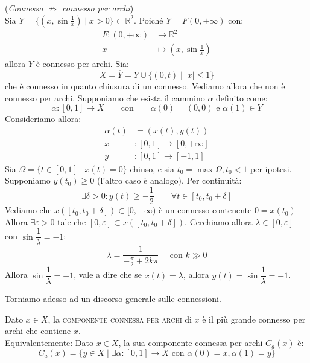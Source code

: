 \begin{ex}(\emph{Connesso $\not\Rightarrow$ connesso per archi})\\
Sia $Y=\{(x, \sin \frac{1}{x}) \mid x>0\} \subset \mathbb{R}^2$. Poiché $Y=F(0,+\infty)$ con:
\begin{align*}
F:(0,+\infty) &\longrightarrow \mathbb{R}^2 \\
x &\longmapsto \left(x,\sin \frac{1}{x}\right)
\end{align*}
allora $Y$ è connesso per archi. Sia:
$$X=\overline{Y}=Y \cup \{(0,t) \mid |x| \le 1\}$$
che è connesso in quanto chiusura di un connesso. Vediamo allora che non è connesso per archi. Supponiamo che esista il cammino $\alpha$ definito come:
$$\alpha:[0,1] \longrightarrow X \qquad \text{con} \qquad \alpha(0)=(0,0) \text{  e  } \alpha(1) \in Y$$
Consideriamo allora:
\begin{align*}
\alpha(t)&=(x(t),y(t))\\
x&:[0,1] \longrightarrow [0,+\infty]\\
y&:[0,1] \longrightarrow [-1,1]
\end{align*}
Sia $\Omega=\{t \in [0,1] \mid x(t)=0\}$ chiuso, e sia $t_0 =\max \Omega, t_0<1$ per ipotesi. Supponiamo $y(t_0) \ge 0$ (l'altro caso è analogo). Per continuità:
$$\exists \delta >0 : y(t) \ge -\dfrac{1}{2} \qquad \forall t \in [t_0,t_0+\delta]$$
Vediamo che $x([t_0,t_0+\delta]) \subset [0,+\infty)$ è un connesso contenente $0=x(t_0)$ Allora $\exists \varepsilon >0$ tale che $[0,\varepsilon]\subset x([t_0,t_0+\delta])$. Cerchiamo allora $\lambda \in [0,\varepsilon]$ con $\sin \dfrac{1}{\lambda}=-1$:
$$\lambda=\dfrac{1}{-\frac{\pi}{2}+2k\pi} \quad \text{ con } k\gg 0$$
Allora $\sin \dfrac{1}{\lambda}=-1$, vale a dire che se $x(t)=\lambda$, allora $y(t)=\sin \dfrac{1}{\lambda}=-1$.
\end{ex}

Torniamo adesso ad un discorso generale sulle connessioni.

\begin{defn}
Dato $x \in X$, la \textsc{componente connessa per archi} di $x$ è il più grande connesso per archi che contiene $x$.\\
\underline{Equivalentemente}: Dato $x \in X$, la sua componente connessa per archi $C_a(x)$ è:
$$C_a(x)=\{y \in X \mid \exists \alpha:[0,1] \longrightarrow X \text{ con } \alpha(0)=x, \alpha(1)=y\}$$
\end{defn}

